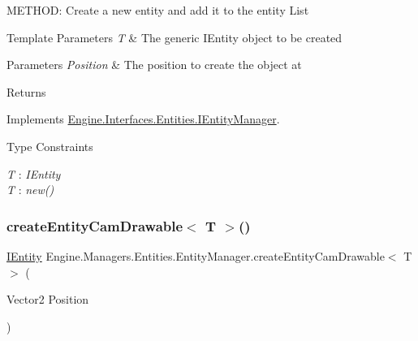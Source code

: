 M\+E\+T\+H\+OD\+: Create a new entity and add it to the entity List 


\begin{DoxyTemplParams}{Template Parameters}
{\em T} & The generic I\+Entity object to be created\\
\hline
\end{DoxyTemplParams}

\begin{DoxyParams}{Parameters}
{\em Position} & The position to create the object at\\
\hline
\end{DoxyParams}
\begin{DoxyReturn}{Returns}

\end{DoxyReturn}


Implements \hyperlink{a00442_a8f746b319d35a76cb4cdb1853f3069ed}{Engine.\+Interfaces.\+Entities.\+I\+Entity\+Manager}.

\begin{Desc}
\item[Type Constraints]\begin{description}
\item[{\em T} : {\em I\+Entity}]\item[{\em T} : {\em new()}]\end{description}
\end{Desc}
\mbox{\label{a00518_a89ca1b1834aff0dc1d2c6ec95dcd0793}} 
\subsubsection{\texorpdfstring{create\+Entity\+Cam\+Drawable$<$ T $>$()}{createEntityCamDrawable< T >()}}
{\footnotesize\ttfamily \hyperlink{a00438}{I\+Entity} Engine.\+Managers.\+Entities.\+Entity\+Manager.\+create\+Entity\+Cam\+Drawable$<$ T $>$ (\begin{DoxyParamCaption}\item[{Vector2}]{Position }\end{DoxyParamCaption})\hspace{0.3cm}{\ttfamily [inline]}}



